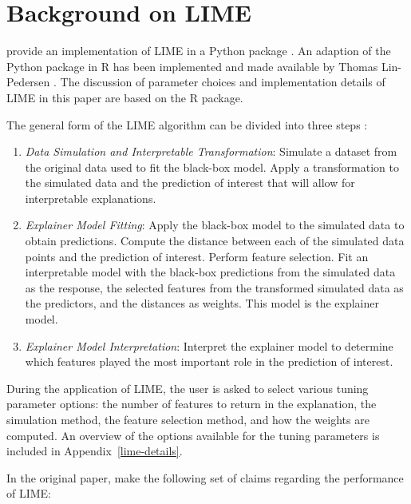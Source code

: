 \documentclass[AMS,STIX2COL]{WileyNJD-v2}\usepackage[]{graphicx}\usepackage[]{color}
\begin{document}
\section{Background on LIME} \label{background}

\citet{ribeiro:2016} provide an implementation of LIME in a Python package \cite{ribeiro:2020}. An adaption of the Python package in R has been implemented and made available by Thomas Lin-Pedersen \citep{pedersen:2020}. The discussion of parameter choices and implementation details of LIME in this paper are based on the R package.

The general form of the LIME algorithm can be divided into three steps \citep[see also][]{laugel:2018}:

\begin{enumerate}

\item \emph{Data Simulation and Interpretable Transformation}: Simulate a dataset from the original data used to fit the black-box model. Apply a transformation to the simulated data and the prediction of interest that will allow for interpretable explanations.

\item \emph{Explainer Model Fitting}: Apply the black-box model to the simulated data to obtain predictions. Compute the distance between each of the simulated data points and the prediction of interest. Perform feature selection. Fit an interpretable model with the black-box predictions from the simulated data as the response, the selected features from the transformed simulated data as the predictors, and the distances as weights. This model is the explainer model.

\item \emph{Explainer Model Interpretation}: Interpret the explainer model to determine which features played the most important role in the prediction of interest.

\end{enumerate}

During the application of LIME, the user is asked to select various tuning parameter options: the number of features to return in the explanation, the simulation method, the feature selection method, and how the weights are computed. An overview of the options available for the tuning parameters is included in Appendix~\ref{lime-details}.

In the original paper, \citet{ribeiro:2016} make the following set of claims regarding the performance of LIME:
\end{document}
